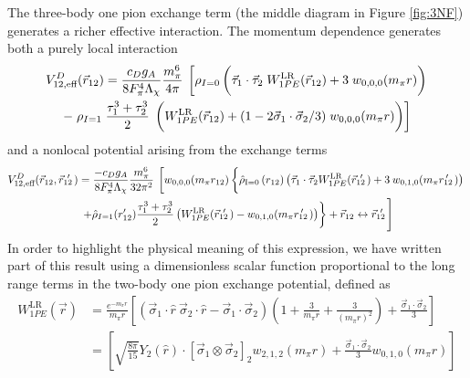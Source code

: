 \documentclass[%
 preprint,
 amsmath,amssymb,
 aps,
]{revtex4-1}
\newcommand{\rhohat}[2]{\hat{\rho}_{\text{I}=#1}\left( #2 \right)}
\newcommand{\yukawa}[1]{\frac{e^{-m_\pi |#1|}}{4\pi |#1|}}
\newcommand{\rot}{\vec{r}_{12}}
\newcommand{\rotp}{\vec{r}_{12}\!\!\!'\,\,}
\newcommand{\rotpr}{r_{12}\!\!\!\!'\,\,\,}
\newcommand{\taudot}{\vec{\tau}_1\cdot\vec{\tau}_2}
\newcommand{\tauplusthree}{\frac{\tau_1^3+\tau_2^3}{2}}
\newcommand{\sigmadot}{\vec{\sigma}_1\cdot\vec{\sigma}_2}
\newcommand{\sigmatwo}{[\vec{\sigma}_1\otimes\vec{\sigma}_2]_2}
\newcommand{\fracphantom}{\vphantom{\frac{1}{1}}}
\newcommand{\w}[4]{w_{#1,#2,#3}(#4)}
\begin{document}
The three-body one pion exchange term (the middle diagram in Figure \ref{fig:3NF}) generates a richer effective interaction. The momentum dependence generates both a purely local interaction
\begin{multline}
V^{D}_{12,\text{eff}}(\rot)=
\frac{c_D g_A}{8 F_\pi^4 \Lambda_\chi} \frac{m_\pi^6}{4\pi}\: \left[\rho_{I=0}\left(\fracphantom\taudot\; W^{\text{LR}}_{1PE}(\rot)  +3\;\w{0}{0}{0}{m_\pi r}\right) \right. \\
-\left. \rho_{I=1}\;\tauplusthree \;\left(\fracphantom W^{\text{LR}}_{1PE}(\rot)+(1-2\sigmadot/3)\;\w{0}{0}{0}{m_\pi r}\right) \right]
\end{multline}
and a nonlocal potential arising from the exchange terms 
\begin{multline}\label{eq:1PENonlocal}
V^{D}_{12,\text{eff}}(\rot,\rotp)=\frac{-c_D g_A }{8 F_\pi^4 \Lambda_\chi} \frac{m_\pi^6}{32\pi^2}\:  \left[ \w{0}{0}{0}{m_\pi r_{12}} \left\{\fracphantom \rhohat{0}{r_{12}}\left(\taudot W^{\text{LR}}_{1PE}(\rotp)+3\:\w{0}{1}{0}{m_\pi \rotpr}\right) \right.\right. \\
\left.\left.+\hat{\rho}_{I=1}(r'_{12}) \tauplusthree \left( W^{\text{LR}}_{1PE}(\rotp)-\w{0}{1}{0}{m_\pi \rotpr}\right) \right\} + \rot \leftrightarrow \rotp \vphantom{\left(\yukawa{r}^2\right)} \right]
\end{multline}
In order to highlight the physical meaning of this expression, we have written part of this result using a dimensionless scalar function proportional to the long range terms in the two-body one pion exchange potential, defined as
\begin{equation}\begin{split}
W^{\text{LR}}_{1PE}(\vec{r})&=\frac{e^{-m_\pi r}}{m_\pi r}\left[\left(\vec{\sigma}_1\cdot\hat{r}\:\vec{\sigma}_2\cdot\hat{r}-\sigmadot\right)\left(1+\frac{3}{m_\pi r}+\frac{3}{(m_\pi r)^2}\right)+\frac{\sigmadot}{3}\right] \\
&=\left[\sqrt{\frac{8\pi}{15}}Y_2(\hat{r})\cdot\sigmatwo\w{2}{1}{2}{m_\pi r}+\frac{\sigmadot}{3}\w{0}{1}{0}{m_\pi r}\right]
\end{split}
\end{equation}
\end{document}
